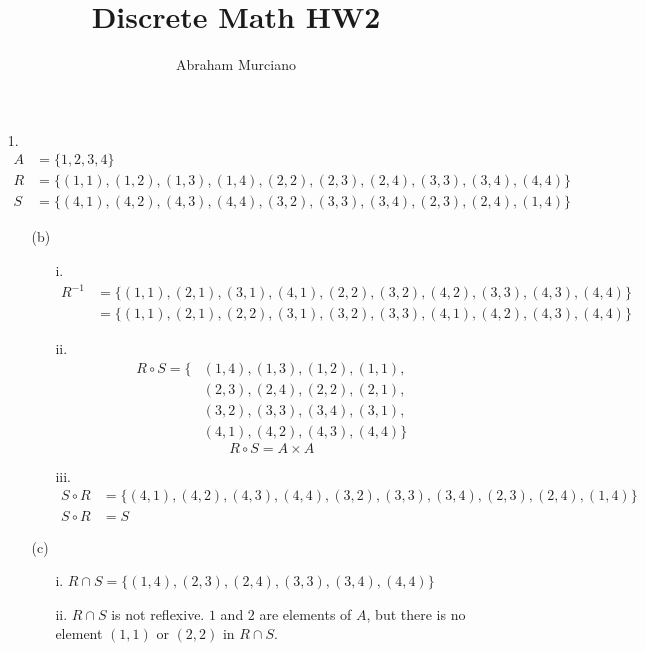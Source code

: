 \documentclass[fleqn]{article}
\title{Discrete Math HW2}
\author{Abraham Murciano}
\begin{document}
\maketitle

\begin{enumerate}
	\item[1.]
	\begin{align*}
		A &= \{1, 2, 3, 4\} \\
		R &= \{(1, 1), (1, 2), (1, 3), (1, 4), (2, 2), (2, 3), (2, 4), (3, 3), (3, 4), (4, 4)\} \\
		S &= \{(4, 1), (4, 2), (4, 3), (4, 4), (3, 2), (3, 3), (3, 4), (2, 3), (2, 4), (1, 4)\}
	\end{align*}
	\begin{enumerate}
		\item[(b)]
		\begin{enumerate}
			\item[i.]
			\begin{align*}
				R^{-1} &= \{(1, 1), (2, 1), (3, 1), (4, 1), (2, 2), (3, 2), (4, 2), (3, 3), (4, 3), (4, 4)\} \\
				&= \{(1, 1), (2, 1), (2, 2), (3, 1), (3, 2), (3, 3), (4, 1), (4, 2), (4, 3), (4, 4)\}
			\end{align*}

			\item[ii.]
			\begin{align*}
				R \circ S = \{&(1, 4), (1, 3), (1, 2), (1, 1), \\
				&(2, 3), (2, 4), (2, 2), (2, 1), \\
				&(3, 2), (3, 3), (3, 4), (3, 1), \\
				&(4, 1), (4, 2), (4, 3), (4, 4)\}
			\end{align*}
			\[R \circ S = A \times A\]

			\item[iii.]
			\begin{align*}
				S \circ R &= \{(4, 1), (4, 2), (4, 3), (4, 4), (3, 2), (3, 3), (3, 4), (2, 3), (2, 4), (1, 4)\} \\
				S \circ R &= S
			\end{align*}
		\end{enumerate}

		\item[(c)]
		\begin{enumerate}
			\item[i.]
			\(R \cap S = \{(1, 4), (2, 3), (2, 4), (3, 3), (3, 4), (4, 4)\}\)

			\item[ii.]
			\(R \cap S\) is not reflexive. \(1\) and \(2\) are elements of \(A\), but there is no element \((1, 1)\) or \((2, 2)\) in \(R \cap S\).


\end{enumerate}
\end{enumerate}
\end{enumerate}
\end{document}
